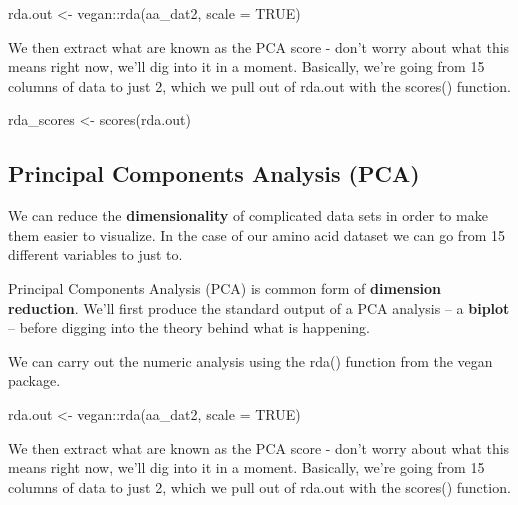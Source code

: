 \documentclass[
]{book}
\newenvironment{Shaded}{\begin{snugshade}}{\end{snugshade}}
\newcommand{\AttributeTok}[1]{\textcolor[rgb]{0.77,0.63,0.00}{#1}}
\newcommand{\ConstantTok}[1]{\textcolor[rgb]{0.00,0.00,0.00}{#1}}
\newcommand{\FunctionTok}[1]{\textcolor[rgb]{0.00,0.00,0.00}{#1}}
\newcommand{\NormalTok}[1]{#1}
\newcommand{\OtherTok}[1]{\textcolor[rgb]{0.56,0.35,0.01}{#1}}
\newcommand{\SpecialCharTok}[1]{\textcolor[rgb]{0.00,0.00,0.00}{#1}}
\begin{document}
\begin{Shaded}
\begin{Highlighting}[]
\NormalTok{rda.out }\OtherTok{\textless{}{-}}\NormalTok{ vegan}\SpecialCharTok{::}\FunctionTok{rda}\NormalTok{(aa\_dat2, }
                      \AttributeTok{scale =} \ConstantTok{TRUE}\NormalTok{)}
\end{Highlighting}
\end{Shaded}

We then extract what are known as the PCA score - don't worry about what this means right now, we'll dig into it in a moment. Basically, we're going from 15 columns of data to just 2, which we pull out of rda.out with the scores() function.

\begin{Shaded}
\begin{Highlighting}[]
\NormalTok{rda\_scores }\OtherTok{\textless{}{-}} \FunctionTok{scores}\NormalTok{(rda.out)}
\end{Highlighting}
\end{Shaded}

\hypertarget{principal-components-analysis-pca-1}{%
\subsection{Principal Components Analysis (PCA)}\label{principal-components-analysis-pca-1}}

We can reduce the \textbf{dimensionality} of complicated data sets in order to make them easier to visualize. In the case of our amino acid dataset we can go from 15 different variables to just to.

Principal Components Analysis (PCA) is common form of \textbf{dimension reduction}. We'll first produce the standard output of a PCA analysis -- a \textbf{biplot} -- before digging into the theory behind what is happening.

We can carry out the numeric analysis using the rda() function from the vegan package.

\begin{Shaded}
\begin{Highlighting}[]
\NormalTok{rda.out }\OtherTok{\textless{}{-}}\NormalTok{ vegan}\SpecialCharTok{::}\FunctionTok{rda}\NormalTok{(aa\_dat2, }
                      \AttributeTok{scale =} \ConstantTok{TRUE}\NormalTok{)}
\end{Highlighting}
\end{Shaded}

We then extract what are known as the PCA score - don't worry about what this means right now, we'll dig into it in a moment. Basically, we're going from 15 columns of data to just 2, which we pull out of rda.out with the scores() function.
\end{document}
